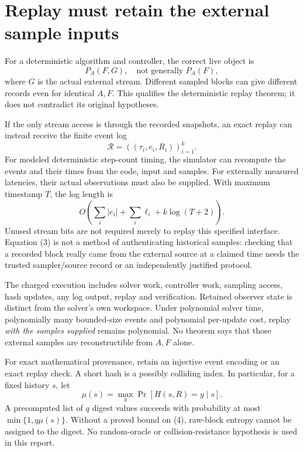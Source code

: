 \documentclass[11pt]{article}
\begin{document}
\section{Replay must retain the external sample inputs}
For a deterministic algorithm and controller, the correct live object is
\[
             P_A(F,G),\quad\text{not generally }P_A(F),     \tag{2}
\]
where $G$ is the actual external stream. Different sampled blocks can give
different records even for identical $A,F$. This qualifies the deterministic
replay theorem; it does not contradict its original hypotheses.

If the only stream access is through the recorded snapshots, an exact replay
can instead receive the finite event log
\[
 \mathcal R=((\tau_i,e_i,R_i))_{i=1}^k.
\]
For modeled deterministic step-count timing, the simulator can recompute the
events and their times from the code, input and samples. For externally
measured latencies, their actual observations must also be supplied. With
maximum timestamp $T$, the log length is
\[
 O\!\left(\sum_i |e_i|+\sum_i\ell_i+k\log(T+2)\right).    \tag{3}
\]
Unused stream bits are not required merely to replay this specified interface.
Equation (3) is not a method of authenticating historical samples: checking
that a recorded block really came from the external source at a claimed time
needs the trusted sampler/source record or an independently justified protocol.

The charged execution includes solver work, controller work, sampling access,
hash updates, any log output, replay and verification. Retained observer state
is distinct from the solver's own workspace. Under polynomial solver time,
polynomially many bounded-size events and polynomial per-update cost, replay
\emph{with the samples supplied} remains polynomial. No theorem says that
those external samples are reconstructible from $A,F$ alone.

For exact mathematical provenance, retain an injective event encoding or an
exact replay check. A short hash is a possibly colliding index. In particular,
for a fixed history $s$, let
\[
 \mu(s)=\max_y\Pr[H(s,R)=y\mid s].                        \tag{4}
\]
A precomputed list of $q$ digest values succeeds with probability at most
$\min\{1,q\mu(s)\}$. Without a proved bound on (4), raw-block entropy cannot
be assigned to the digest. No random-oracle or collision-resistance hypothesis
is used in this report.
\end{document}
